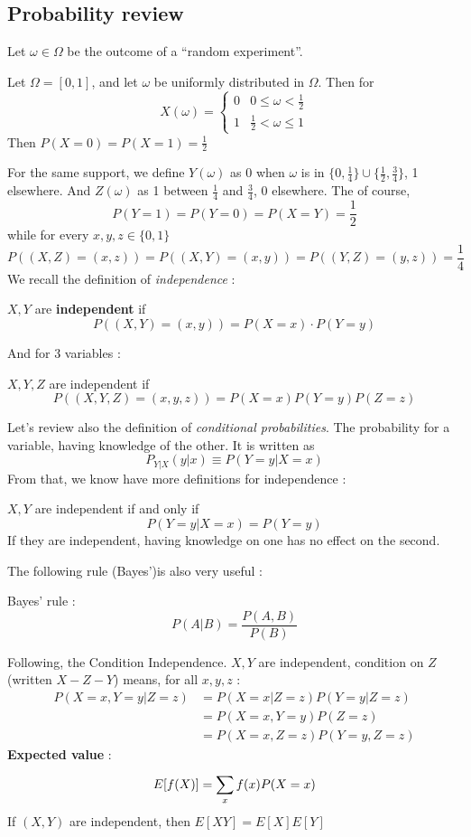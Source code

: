 \documentclass[11pt,a4paper]{article}
\begin{document}
\subsection{Probability review}
Let $\omega \in \Omega$ be the outcome of a ``random experiment''.
\begin{example}
    Let $\Omega = [0,1]$, and let $\omega$ be uniformly distributed in $\Omega$. Then for 
    \[X(\omega) = \left\{\begin{array}{ll}
        0 & 0\leq \omega < \frac{1}{2}\\
        1 & \frac{1}{2} < \omega \leq 1
\end{array}\right.\]
Then $P(X=0) = P(X=1) = \frac{1}{2}$
\end{example}
For the same support, we define $Y(\omega)$ as 0 when $\omega$ is in $\{0, \frac{1}{4}\} \cup \{\frac{1}{2},\frac{3}{4}\}$, 1 elsewhere. And $Z(\omega)$ as 1 between $\frac{1}{4}$ and $\frac{3}{4}$, 0 elsewhere. The of course, \[P(Y=1) = P(Y=0) = P(X=Y) = \frac{1}{2}\] while for every $x,y,z \in \{0,1\}$
\[P((X,Z) = (x,z)) = P((X,Y) = (x,y)) = P((Y,Z) = (y,z)) = \frac{1}{4}\]
We recall the definition of \textit{independence} : 
\begin{definition}
    $X,Y$ are \textbf{independent} if 
    \[P((X,Y) = (x,y)) = P(X=x) \cdot P(Y=y)\]
\end{definition}
And for 3 variables : 
\begin{definition}
    $X,Y,Z$ are independent if
    \[P((X,Y,Z) = (x,y,z)) = P(X=x)P(Y=y)P(Z=z)\]
\end{definition}
Let's review also the definition of \textit{conditional probabilities}. The probability for a variable, having knowledge of the other. It is written as
\[P_{Y|X}(y|x) \equiv P(Y=y | X=x)\]
From that, we know have more definitions for independence : 
\begin{definition}
    $X,Y$ are independent if and only if
    \[P(Y=y | X=x) = P(Y=y)\]
    If they are independent, having knowledge on one has no effect on the second.
\end{definition}
The following rule (Bayes')is also very useful : 
\begin{definition}
    Bayes' rule :
    \[P(A|B) = \frac{P(A,B)}{P(B)}\]
\end{definition}
Following, the Condition Independence. $X,Y$ are independent, condition on $Z$ (written $X-Z-Y$) means, for all $x,y,z$ :
\[\begin{array}{ll}
    P(X=x,Y=y|Z=z) &= P(X=x|Z=z)P(Y=y|Z=z)\\& = P(X=x,Y=y)P(Z=z)\\& = P(X=x,Z=z)P(Y=y,Z=z)
\end{array}\]
\textbf{Expected value} : 
\[E[f(X)] = \sum\limits_{x}^{} f(x)P(X=x)\]
If $(X,Y)$ are independent, then $E[XY] = E[X]E[Y]$
\end{document}
